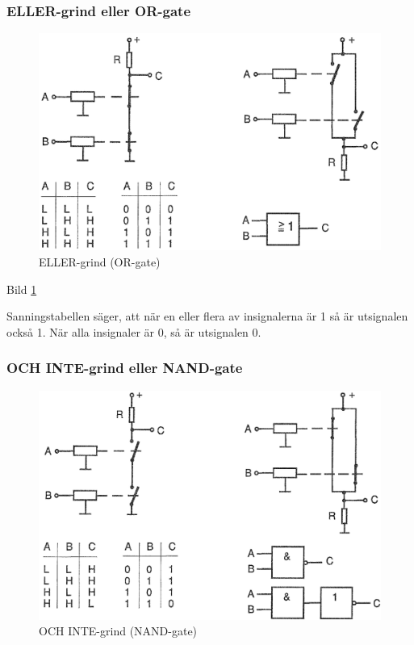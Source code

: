 \subsubsection{ELLER-grind eller OR-gate}

\begin{figure}
\includegraphics[width=\textwidth]{images/cropped_pdfs/bild_2_2-38.pdf}
\caption{ELLER-grind (OR-gate)}
\label{fig:BildII2-38}
\end{figure}

Bild \ref{fig:BildII2-38}

Sanningstabellen säger, att när en eller flera av insignalerna är 1 så är
utsignalen också 1. När alla insignaler är 0, så är utsignalen 0.

\subsubsection{OCH INTE-grind eller NAND-gate}

\begin{figure}
\includegraphics[width=\textwidth]{images/cropped_pdfs/bild_2_2-39.pdf}
\caption{OCH INTE-grind (NAND-gate)}
\label{fig:BildII2-39}
\end{figure}

